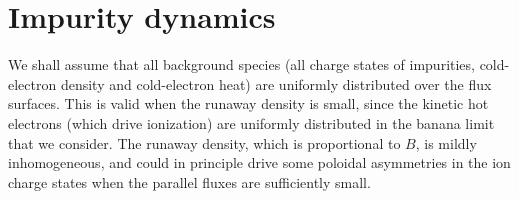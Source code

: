 \documentclass[11pt,a4paper]{article}
\newcommand{\rd}{\ensuremath{\mathrm{d}}}
\begin{document}
%


\section{Impurity dynamics}
We shall assume that all background species (all charge states of impurities, cold-electron density and cold-electron heat) are uniformly distributed over the flux surfaces. This is valid when the runaway density is small, since the kinetic hot electrons (which drive ionization) are uniformly distributed in the banana limit that we consider. The runaway density, which is proportional to $B$, is mildly inhomogeneous, and could in principle drive some poloidal asymmetries in the ion charge states when the parallel fluxes are sufficiently small. 
\end{document}
